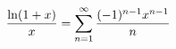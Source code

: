 \documentclass[preview]{standalone}
\begin{document}
\begin{align*}
\special{dvisvgm:raw <g id='unique000'>}\dfrac{\ln(1+x)}{x}=\displaystyle\sum_{n=1}^{\infty}\dfrac{(-1)^{n-1}x^{n-1}}{n}\special{dvisvgm:raw </g>}
\end{align*}
\end{document}
